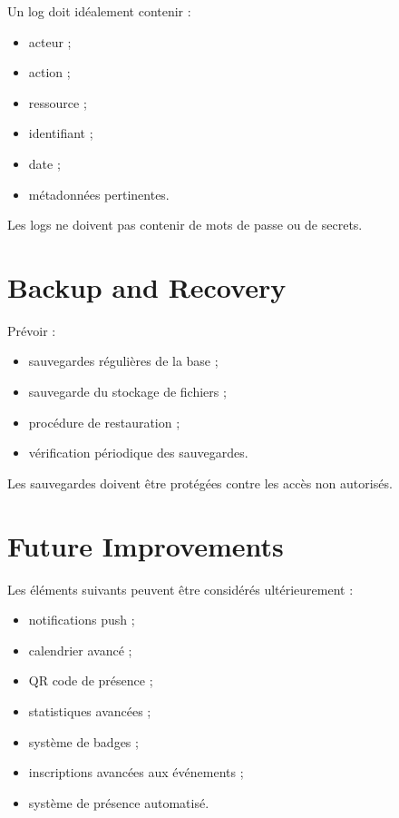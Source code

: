 \documentclass[11pt,a4paper]{report}
\begin{document}
Un log doit idéalement contenir :

\begin{itemize}
    \item acteur ;
    \item action ;
    \item ressource ;
    \item identifiant ;
    \item date ;
    \item métadonnées pertinentes.
\end{itemize}

Les logs ne doivent pas contenir de mots de passe ou de secrets.

\chapter{Backup and Recovery}

Prévoir :

\begin{itemize}
    \item sauvegardes régulières de la base ;
    \item sauvegarde du stockage de fichiers ;
    \item procédure de restauration ;
    \item vérification périodique des sauvegardes.
\end{itemize}

Les sauvegardes doivent être protégées contre les accès non autorisés.

\chapter{Future Improvements}

Les éléments suivants peuvent être considérés ultérieurement :

\begin{itemize}
    \item notifications push ;
    \item calendrier avancé ;
    \item QR code de présence ;
    \item statistiques avancées ;
    \item système de badges ;
    \item inscriptions avancées aux événements ;
    \item système de présence automatisé.
\end{itemize}
\end{document}
